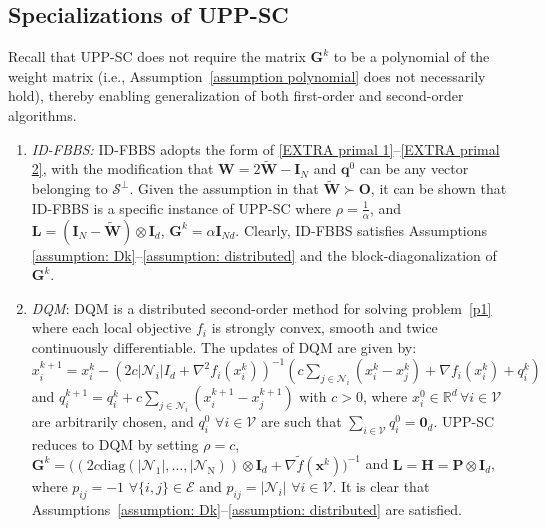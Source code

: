 \documentclass[12pt,draftcls,onecolumn]{IEEEtran}
\newcommand{\bx}{{\mathbf{x}}}
\newcommand{\bG}{{\mathbf{G}}}
\newcommand{\bL}{{\mathbf{L}}}
\newcommand{\bI}{{\mathbf{I}}}
\newcommand{\bW}{{\mathbf{W}}}
\begin{document}
    \subsection{Specializations of UPP-SC}
    Recall that UPP-SC does not require the matrix $\bG^k$ to be a polynomial of the weight matrix (i.e., Assumption~\ref{assumption polynomial} does not necessarily hold), thereby enabling generalization of both first-order and second-order algorithms. 
    \begin{enumerate}
        \item[1)] \textit{ID-FBBS:} ID-FBBS \cite{xu_bregman_2018} adopts the form of \eqref{EXTRA primal 1}--\eqref{EXTRA primal 2}, with the modification that $\bW = 2 \tilde{\bW} - \bI_N$ and $\mathbf{q}^0$ can be any vector belonging to $\mathcal{S}^{\perp}$. Given the assumption in \cite{xu_bregman_2018} that $\tilde{\bW} \succ \mathbf{O}$, it can be shown that ID-FBBS is a specific instance of UPP-SC where $\rho = \frac{1}{\alpha}$, and $\bL=(\bI_N-\tilde{\bW})\otimes \bI_d$, $\bG^k=\alpha\bI_{Nd}$. Clearly, ID-FBBS satisfies Assumptions \ref{assumption: Dk}--\ref{assumption: distributed} and the block-diagonalization of $\bG^k$.
        \item[2)] \textit{DQM}: DQM \cite{mokhtari_dqm_2016} is a distributed second-order method for solving problem~\eqref{p1} where each local objective $f_i$ is strongly convex, smooth and twice continuously differentiable. The updates of DQM are given by: $x_i^{k+1}=x_i^k-\left(2c |\mathcal{N}_i| I_d + \nabla^2 f_i(x_i^k)\right)^{-1} ( c \sum_{j \in \mathcal{N}_i} (x_i^k - x_j^k)+ \nabla f_i(x_i^k) + q_i^k )$ and $q_i^{k+1}=q_i^k+c \sum_{j \in \mathcal{N}_i} (x_i^{k+1} - x_j^{k+1})$ with $c>0$, where $x_i^0\in\mathbb{R}^d\,\forall i\in\mathcal{V}$ are arbitrarily chosen, and $q_i^0\,\,\forall i \in \mathcal{V}$ are such that $\sum_{i\in\mathcal{V}}q_i^0=\mathbf{0}_d$. UPP-SC reduces to DQM by setting $\rho=c$, $\bG^k=\big((2c\operatorname{diag(|\mathcal{N}_1|,\dots,|\mathcal{N}_N)})\otimes \bI_d+\nabla \tilde{f}(\bx^k)\big)^{-1}$ and $\bL=\mathbf{H}=\mathbf{P}\otimes \bI_d$, where $p_{ij}=-1\,\,\forall \{i,j\}\in\mathcal{E}$ and $p_{ij}=|\mathcal{N}_i|\,\,\forall i\in\mathcal{V}$. It is clear that Assumptions~\ref{assumption: Dk}--\ref{assumption: distributed} are satisfied.

\end{enumerate}
\end{document}
